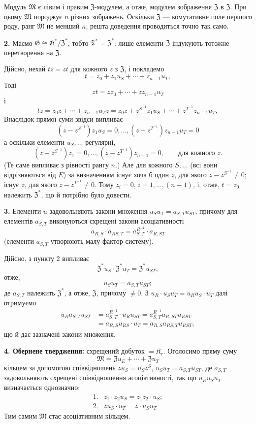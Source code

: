 \documentclass[11pt]{article}
\begin{document}
Модуль \(\mathfrak M\) є лівим і правим \(\mathfrak Z\)-модулем, а отже, модулем зображення \(\mathfrak Z\) в \(\mathfrak Z\). При цьому \(\mathfrak M\) породжує \(n\) різних зображень. Оскільки \(\mathfrak Z\) --- комутативне поле першого роду, ранг \(\mathfrak M\) не менший \(n\); решта доведення проводиться точно так само.

\noindent\textbf{2.} Маємо \(\mathfrak G\cong\mathfrak G^*/\mathfrak Z^*\), тобто \(\mathfrak T^*=\mathfrak Z^*\): лише елементи \(\mathfrak Z\) індукують тотожне перетворення на \(\mathfrak Z\).

Дійсно, нехай \(tz=zt\) для кожного \(z\) з \(\mathfrak Z\), і покладемо
\[
t=z_0+z_1u_S+\cdots+z_{n-1}u_T,
\]
Тоді
\[
zt=zz_0+\cdots+zz_{n-1}u_T
\]
і
\[
tz=z_0z+\cdots+z_{n-1}u_Tz
=z_0z+z^{S^{-1}}z_1u_S+\cdots+z^{T^{-1}}z_{n-1}u_T,
\]
Внаслідок прямої суми звідси випливає
\[
(z-z^{S^{-1}})z_1u_S=0,\ldots,
(z-z^{T^{-1}})z_{n-1}u_T=0
\]
а оскільки елементи \(u_S,\ldots\) регулярні,
\[
(z-z^{S^{-1}})z_1=0,\ldots,
(z-z^{T^{-1}})z_{n-1}=0,
\qquad\text{для кожного }z.
\]
(Те саме випливає з рівності рангу \(n\).) Але для кожного \(S,\ldots\) (всі вони відрізняються від \(E\)) за визначенням існує хоча б один \(z\), для якого \(z-z^{S^{-1}}\neq0\); існує \(\bar z\), для якого \(\bar z-\bar z^{T^{-1}}\neq0\). Тому \(z_i=0\), \(i=1,\ldots,(n-1)\), і, отже, \(t=z_0\) належить \(\mathfrak Z^*\), що й потрібно було довести.

\noindent\textbf{3.} Елементи \(u\) задовольняють закони множення \(u_Su_T=a_{S,T}u_{ST}\), причому для елементів \(a_{S,T}\) виконуються схрещені закони асоціативності
\[
a_{R,S}\cdot a_{RS,T}=a_{S,T}^{R^{-1}}\cdot a_{R,ST}
\]
(елементи \(a_{S,T}\) утворюють малу фактор-систему).

Дійсно, з пункту 2 випливає
\[
\mathfrak Z^*u_S\cdot\mathfrak Z^*u_T=\mathfrak Z^*u_{ST};
\]
отже,
\[
u_Su_T=a_{S,T}u_{ST};
\]
де \(a_{S,T}\) належить \(\mathfrak Z^*\), а отже, \(\mathfrak Z\), причому \(\neq0\). З \(u_R\cdot u_Su_T=u_Ru_S\cdot u_T\) далі отримуємо
\[
\begin{aligned}
u_Ra_{S,T}u_{ST}
&=a_{S,T}^{R^{-1}}\cdot u_Ru_{ST}
 =a_{S,T}^{R^{-1}}a_{R,ST}u_{RST}\\
&=a_{R,S}u_{RS}\cdot u_T
 =a_{R,S}a_{RS,T}u_{RST},
\end{aligned}
\]
що й дає зазначені закони множення.

\noindent\textbf{4. Обернене твердження:} схрещений добуток \(=\mathfrak K_r\). Оголосимо пряму суму
\[
\mathfrak M=\mathfrak Zu_E+\cdots+\mathfrak Zu_T
\]
кільцем за допомогою співвідношень \(zu_S=u_Sz^S\), \(u_Su_T=a_{S,T}u_{ST}\), де \(a_{S,T}\) задовольняють схрещені співвідношення асоціативності, так що \(u_Ru_Su_T\) визначається однозначно:
\[
\begin{array}{ll}
1.&z_1\cdot z_2u_S=z_1z_2\cdot u_S;\\[2pt]
2.&zu_S\cdot u_T=z\cdot u_Su_T
\end{array}
\]
Тим самим \(\mathfrak M\) стає асоціативним кільцем.
\end{document}
